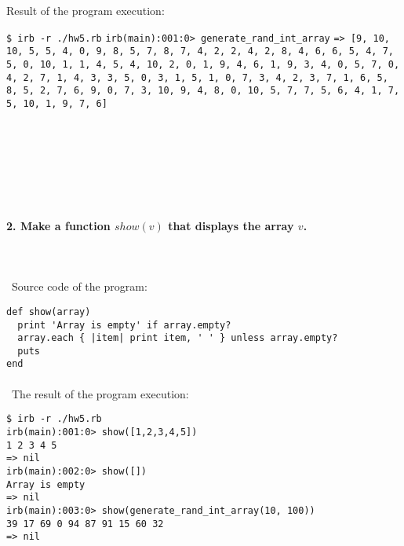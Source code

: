 \documentclass{article}
\begin{document}
\paragraph{}\

	Result of the program execution:
\rmfamily\newline

\noindent \texttt{\$ irb -r ./hw5.rb}\newline
\noindent \texttt{irb(main):001:0> generate_rand_int_array}\newline
\noindent \texttt{=> [9, 10, 10, 5, 5, 4, 0, 9, 8, 5, 7, 8, 7, 4, 2, 2, 4, 2, 8, 4, 6, 6, 5, 4, 7, 5, 0, 10, 1, 1, 4, 5, 4, 10, 2, 0, 1, 9, 4, 6, 1, 9, 3, 4, 0, 5, 7, 0, 4, 2, 7, 1, 4, 3, 3, 5, 0, 3, 1, 5, 1, 0, 7, 3, 4, 2, 3, 7, 1, 6, 5, 8, 5, 2, 7, 6, 9, 0, 7, 3, 10, 9, 4, 8, 0, 10, 5, 7, 7, 5, 6, 4, 1, 7, 5, 10, 1, 9, 7, 6]}

\paragraph{}\
\paragraph{}\
\paragraph{}\

	\paragraph{2. Make a function \(show(v)\) that displays the array \(v\). }\

\paragraph{}\	
Source code of the program:

\begin{verbatim} 
def show(array)
  print 'Array is empty' if array.empty?
  array.each { |item| print item, ' ' } unless array.empty?
  puts
end
\end{verbatim}	

\paragraph{}\
	The result of the program execution:
	
\begin{verbatim} 
$ irb -r ./hw5.rb
irb(main):001:0> show([1,2,3,4,5])
1 2 3 4 5
=> nil
irb(main):002:0> show([])
Array is empty
=> nil
irb(main):003:0> show(generate_rand_int_array(10, 100))
39 17 69 0 94 87 91 15 60 32
=> nil
\end{verbatim}
	
\end{document}
